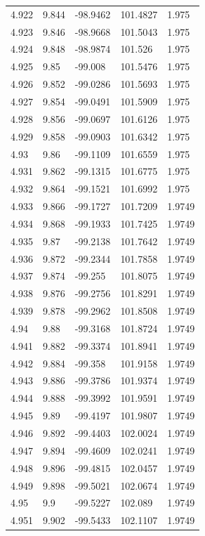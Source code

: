 \begin{tabular}{lllll}
4.922 & 9.844 & -98.9462 & 101.4827 & 1.975 \\
4.923 & 9.846 & -98.9668 & 101.5043 & 1.975 \\
4.924 & 9.848 & -98.9874 & 101.526 & 1.975 \\
4.925 & 9.85 & -99.008 & 101.5476 & 1.975 \\
4.926 & 9.852 & -99.0286 & 101.5693 & 1.975 \\
4.927 & 9.854 & -99.0491 & 101.5909 & 1.975 \\
4.928 & 9.856 & -99.0697 & 101.6126 & 1.975 \\
4.929 & 9.858 & -99.0903 & 101.6342 & 1.975 \\
4.93 & 9.86 & -99.1109 & 101.6559 & 1.975 \\
4.931 & 9.862 & -99.1315 & 101.6775 & 1.975 \\
4.932 & 9.864 & -99.1521 & 101.6992 & 1.975 \\
4.933 & 9.866 & -99.1727 & 101.7209 & 1.9749 \\
4.934 & 9.868 & -99.1933 & 101.7425 & 1.9749 \\
4.935 & 9.87 & -99.2138 & 101.7642 & 1.9749 \\
4.936 & 9.872 & -99.2344 & 101.7858 & 1.9749 \\
4.937 & 9.874 & -99.255 & 101.8075 & 1.9749 \\
4.938 & 9.876 & -99.2756 & 101.8291 & 1.9749 \\
4.939 & 9.878 & -99.2962 & 101.8508 & 1.9749 \\
4.94 & 9.88 & -99.3168 & 101.8724 & 1.9749 \\
4.941 & 9.882 & -99.3374 & 101.8941 & 1.9749 \\
4.942 & 9.884 & -99.358 & 101.9158 & 1.9749 \\
4.943 & 9.886 & -99.3786 & 101.9374 & 1.9749 \\
4.944 & 9.888 & -99.3992 & 101.9591 & 1.9749 \\
4.945 & 9.89 & -99.4197 & 101.9807 & 1.9749 \\
4.946 & 9.892 & -99.4403 & 102.0024 & 1.9749 \\
4.947 & 9.894 & -99.4609 & 102.0241 & 1.9749 \\
4.948 & 9.896 & -99.4815 & 102.0457 & 1.9749 \\
4.949 & 9.898 & -99.5021 & 102.0674 & 1.9749 \\
4.95 & 9.9 & -99.5227 & 102.089 & 1.9749 \\
4.951 & 9.902 & -99.5433 & 102.1107 & 1.9749 \\

\end{tabular}
